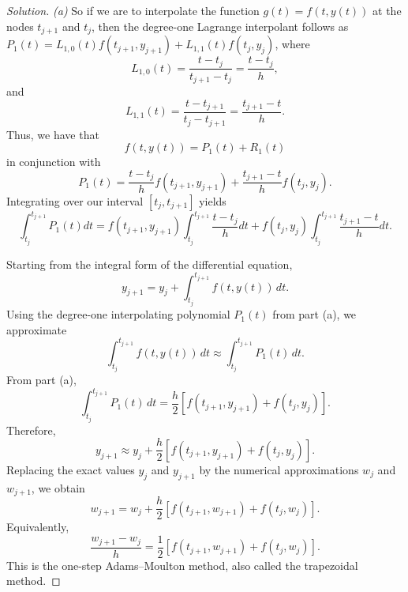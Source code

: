 \documentclass[12pt]{amsart}
\newenvironment{solution}
{\begin{proof}[Solution]}
{\end{proof}}
\begin{document}
\begin{onehalfspace}
\begin{solution}
            \emph{(a)} So if we are to interpolate the function $g(t) = f(t, y(t))$ at the nodes $t_{j+1}$ and
            $t_j$, then the degree-one Lagrange interpolant follows as $P_1(t) = L_{1,0}(t)f(t_{j+1}, y_{j+1}) +
            L_{1,1}(t)f(t_j, y_j)$, where
            \[
                L_{1,0}(t) = \frac{t-t_j}{t_{j+1} - t_j} = \frac{t - t_j}{h},
            \]
            and
            \[
                L_{1,1}(t) = \frac{t-t_{j+1}}{t_j - t_{j+1}} = \frac{t_{j+1} - t}{h}.
            \]
            Thus, we have that
            \[
                f(t,y(t)) = P_1(t) + R_1(t)
            \]
            in conjunction with
            \[
                P_1(t) = \frac{t-t_j}{h}f(t_{j+1}, y_{j+1}) + \frac{t_{j+1} - t}{h}f(t_j, y_j).
            \]
            Integrating over our interval $[t_j, t_{j+1}]$ yields
            \[
                \int_{t_j}^{t_{j+1}}P_1(t) dt = f(t_{j+1},y_{j+1})\int_{t_j}^{t_{j+1}} \frac{t-t_j}{h}dt + f(t_j, y_j)
                \int_{t_j}^{t_{j+1}}\frac{t_{j+1} - t}{h} dt.
            \]

            \item[(b)] Starting from the integral form of the differential equation,
            \[
                y_{j+1}
                =
                y_j
                +
                \int_{t_j}^{t_{j+1}} f(t,y(t))\,dt.
            \]
            Using the degree-one interpolating polynomial \(P_1(t)\) from part (a), we approximate
            \[
                \int_{t_j}^{t_{j+1}} f(t,y(t))\,dt
                \approx
                \int_{t_j}^{t_{j+1}} P_1(t)\,dt.
            \]
            From part (a),
            \[
                \int_{t_j}^{t_{j+1}} P_1(t)\,dt
                =
                \frac{h}{2}
                \left[
                    f(t_{j+1},y_{j+1})
                +
                f(t_j,y_j)
                \right].
            \]
            Therefore,
            \[
                y_{j+1}
                \approx
                y_j
                +
                \frac{h}{2}
                \left[
                    f(t_{j+1},y_{j+1})
                +
                f(t_j,y_j)
                \right].
            \]
            Replacing the exact values \(y_j\) and \(y_{j+1}\) by the numerical
            approximations \(w_j\) and \(w_{j+1}\), we obtain
            \[
                w_{j+1}
                =
                w_j
                +
                \frac{h}{2}
                \left[
                    f(t_{j+1},w_{j+1})
                +
                f(t_j,w_j)
                \right].
            \]
            Equivalently,
            \[
                \frac{w_{j+1}-w_j}{h}
                =
                \frac{1}{2}
                \left[
                    f(t_{j+1},w_{j+1})
                +
                f(t_j,w_j)
                \right].
            \]
            This is the one-step Adams--Moulton method, also called the
            trapezoidal method.


\end{solution}
\end{onehalfspace}
\end{document}
